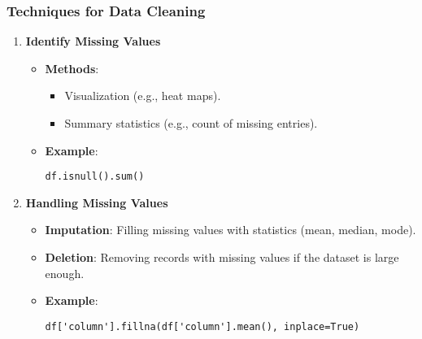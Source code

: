 \documentclass{beamer}
\begin{document}
\begin{frame}[fragile]
    \frametitle{Techniques for Data Cleaning}
    \begin{enumerate}
        \item \textbf{Identify Missing Values}
        \begin{itemize}
            \item \textbf{Methods}:
                \begin{itemize}
                    \item Visualization (e.g., heat maps).
                    \item Summary statistics (e.g., count of missing entries).
                \end{itemize}
            \item \textbf{Example}:
                \begin{lstlisting}
df.isnull().sum()
                \end{lstlisting}
        \end{itemize}

        \item \textbf{Handling Missing Values}
        \begin{itemize}
            \item \textbf{Imputation}: Filling missing values with statistics (mean, median, mode).
            \item \textbf{Deletion}: Removing records with missing values if the dataset is large enough.
            \item \textbf{Example}:
                \begin{lstlisting}
df['column'].fillna(df['column'].mean(), inplace=True)
                \end{lstlisting}
        \end{itemize}
    \end{enumerate}
\end{frame}
\end{document}
